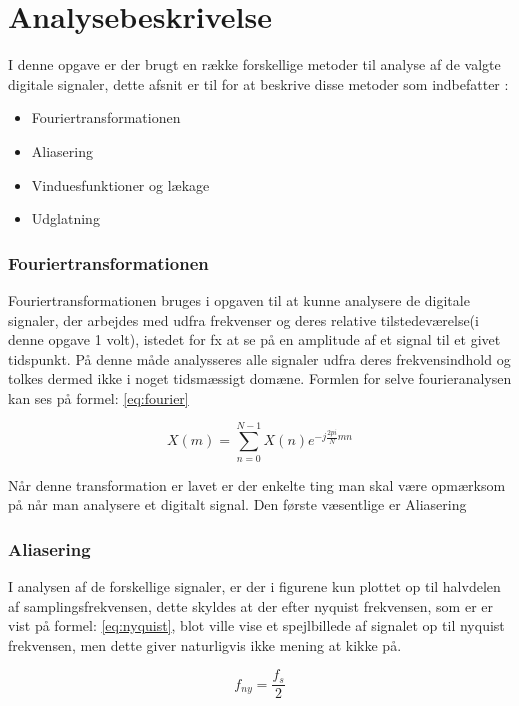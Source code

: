\chapter{Analysebeskrivelse}\label{ch:analysebeskrivelse}

I denne opgave er der brugt en række forskellige metoder til analyse af de valgte digitale signaler, dette afsnit er til for at beskrive disse metoder som indbefatter :
\begin{itemize}
\item Fouriertransformationen
\item Aliasering
\item Vinduesfunktioner og lækage
\item Udglatning
\end{itemize}
 
 
 
\subsection{Fouriertransformationen}

Fouriertransformationen bruges i opgaven til at kunne analysere de digitale signaler, der arbejdes med udfra frekvenser og deres relative tilstedeværelse(i denne opgave 1 volt), istedet for fx at se på en amplitude af et signal til et givet tidspunkt. På denne måde analysseres alle signaler udfra deres frekvensindhold og tolkes dermed ikke i noget tidsmæssigt domæne. Formlen for selve fourieranalysen kan ses på formel: \eqref{eq:fourier}

\begin{equation}\label{eq:fourier}
	{X(m)} = \displaystyle\sum_{n=0}^{N-1} {X(n)e^{-j\frac{2pi}{N}mn}}
\end{equation}
 
 Når denne transformation er lavet er der enkelte ting man skal være opmærksom på når man analysere et digitalt signal. Den første væsentlige er Aliasering 


\subsection{Aliasering}
I analysen af de forskellige signaler, er der i figurene kun plottet op til halvdelen af samplingsfrekvensen, dette skyldes at der efter nyquist frekvensen, som er er vist på formel: \eqref{eq:nyquist}, blot ville vise et spejlbillede af signalet op til nyquist frekvensen, men dette giver naturligvis ikke mening at kikke på.
 
  \begin{equation}\label{eq:nyquist}
  f_{ny} = \frac{f_s}{2} 
  \end{equation}
 
